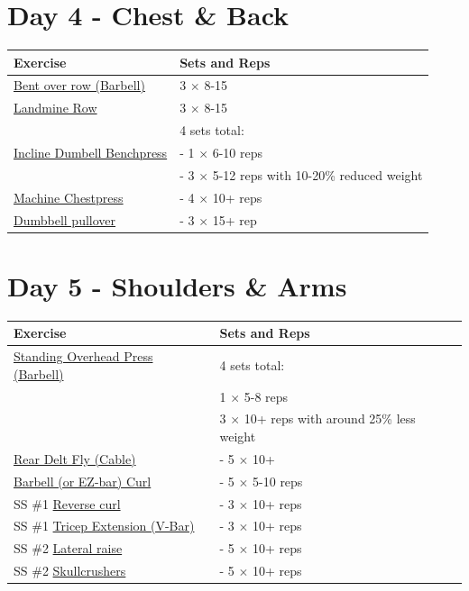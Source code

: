 \documentclass[11pt]{article}
\begin{document}
\section*{Day 4 - Chest \& Back}
\begin{center}
\begin{tabular}{|l|l|}
\hline
\textbf{Exercise} & \textbf{Sets and Reps}\\
\hline
\href{https://www.youtube.com/shorts/3OAG3sTlljk}{Bent over row (Barbell)} & 3 $\times$ 8-15 \\
\hline
\href{https://www.youtube.com/shorts/djvBoUaGDes}{Landmine Row} & 3 $\times$ 8-15 \\
\hline
& 4 sets total: \\
\href{https://www.youtube.com/watch?v=0f6-uCUKqgA}{Incline Dumbell Benchpress} & - 1  $\times$ 6-10 reps \\
& - 3  $\times$ 5-12 reps with 10-20\% reduced weight \\
\hline
\href{https://www.youtube.com/watch?v=dQw4w9WgXcQ}{Machine Chestpress} & - 4 $\times$ 10+ reps \\
\hline
\href{https://www.youtube.com/watch?v=FK4rHfWKEac}{Dumbbell pullover} & - 3 $\times$ 15+ rep\\
\hline
\end{tabular}
\end{center}

\section*{Day 5 - Shoulders \& Arms}
\begin{center}
\begin{tabular}{|l|l|}
\hline
\textbf{Exercise} & \textbf{Sets and Reps}\\
\hline
\href{https://www.youtube.com/watch?v=OSJsEPfEcU0}{Standing Overhead Press (Barbell)} & 4 sets total: \\
& 1 $\times$ 5-8 reps \\
& 3 $\times$ 10+ reps with around 25\% less weight \\
\hline
\href{https://www.youtube.com/watch?v=JENKmsEZQO8}{Rear Delt Fly (Cable)} & - 5 $\times$ 10+ \\
\hline
\href{https://www.youtube.com/watch?v=bAWLx7PPK10}{Barbell (or EZ-bar) Curl} & - 5 $\times$ 5-10 reps \\
\hline
SS \#1 \href{https://www.youtube.com/shorts/zuUo-wwFQGw}{Reverse curl} & - 3 $\times$ 10+ reps \\
SS \#1 \href{https://www.youtube.com/watch?v=cGi9eO3QnOA}{Tricep Extension (V-Bar)} & - 3 $\times$ 10+ reps \\
\hline
SS \#2 \href{https://www.youtube.com/watch?v=n5dsI9qQXwY}{Lateral raise} & - 5 $\times$ 10+ reps\\
SS \#2 \href{https://www.youtube.com/watch?v=d_KZxkY_0cM}{Skullcrushers}  & - 5 $\times$ 10+ reps\\
\hline


\end{tabular}
\end{center}
\end{document}
